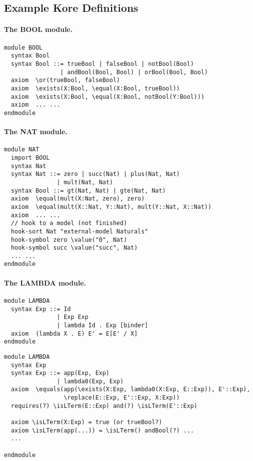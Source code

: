 \documentclass[UTF8]{article}
\theoremstyle{plain}
\theoremstyle{definition}
\theoremstyle{remark}
\begin{document}
\subsection{Example Kore Definitions}

\paragraph{The {\small BOOL} module.}\quad
\begin{Verbatim}
module BOOL
  syntax Bool
  syntax Bool ::= trueBool | falseBool | notBool(Bool)
                | andBool(Bool, Bool) | orBool(Bool, Bool)
  axiom  \or(trueBool, falseBool)
  axiom  \exists(X:Bool, \equal(X:Bool, trueBool))
  axiom  \exists(X:Bool, \equal(X:Bool, notBool(Y:Bool)))
  axiom  ... ...
endmodule
\end{Verbatim}

\paragraph{The {\small NAT} module.}\quad  
\begin{Verbatim}
module NAT
  import BOOL
  syntax Nat
  syntax Nat ::= zero | succ(Nat) | plus(Nat, Nat) 
               | mult(Nat, Nat)
  syntax Bool ::= gt(Nat, Nat) | gte(Nat, Nat)
  axiom  \equal(mult(X:Nat, zero), zero)
  axiom  \equal(mult(X::Nat, Y::Nat), mult(Y::Nat, X::Nat))
  axiom  ... ...
  // hook to a model (not finished)
  hook-sort Nat "external-model Naturals"
  hook-symbol zero \value("0", Nat)
  hook-symbol succ \value("succ", Nat)
  ... ...
endmodule
\end{Verbatim}

\paragraph{The {\small LAMBDA} module.}\quad
\begin{Verbatim}
module LAMBDA
  syntax Exp ::= Id 
               | Exp Exp 
               | lambda Id . Exp [binder]
  axiom  (lambda X . E) E' = E[E' / X]
endmodule
\end{Verbatim}

\begin{Verbatim}
module LAMBDA
  syntax Exp
  syntax Exp ::= app(Exp, Exp)
               | lambda0(Exp, Exp)
  axiom  \equals(app(\exists(X:Exp, lambda0(X:Exp, E::Exp)), E'::Exp),
                 \replace(E::Exp, E'::Exp, X:Exp))
  requires(?) \isLTerm(E::Exp) and(?) \isLTerm(E'::Exp)
  
  axiom \isLTerm(X:Exp) = true (or trueBool?)
  axiom \isLTerm(app(...)) = \isLTerm() andBool(?) ...
  ...
      
endmodule
\end{Verbatim}
\end{document}
